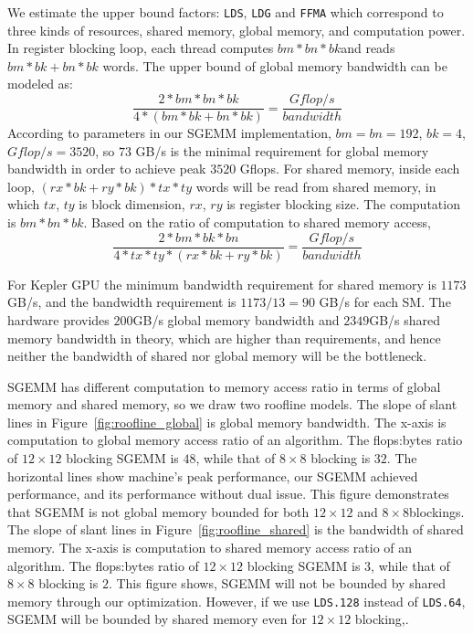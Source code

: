 We estimate the upper bound factors: {\tt LDS}, {\tt LDG} and {\tt FFMA} which correspond to three kinds of resources, 
shared
memory, global memory, and computation power. In register blocking loop, each thread computes $bm*bn*bk$and reads $bm*bk+bn*bk$ words. The upper bound of global memory bandwidth can be modeled as:
\begin{displaymath}
    \frac{2*bm*bn*bk}{4*(bm*bk + bn*bk)} = \frac{Gflop/s}{bandwidth}
\end{displaymath}
According to parameters in our SGEMM implementation, $bm=bn=192$, $bk=4$, $Gflop/s=3520$, so $73$ GB/s is the minimal
requirement for global memory bandwidth in order to achieve peak $3520$ Gflops.
For shared memory, inside each loop, $(rx*bk + ry * bk)*tx*ty$ words will be read from shared memory, in which $tx$,
$ty$ is block dimension, $rx$, $ry$ is register blocking size. The computation is $bm*bn*bk$. Based on the ratio of computation to shared memory access,
\begin{displaymath}
    \frac{2*bm*bk*bn}{4*tx*ty*(rx*bk + ry *bk)}  = \frac{Gflop/s}{bandwidth}
\end{displaymath}


For Kepler GPU the minimum bandwidth requirement for shared memory is $1173$GB/s, and the bandwidth requirement is
$1173/13=90$ GB/s for each SM. The hardware provides $200$GB/s global memory bandwidth and $2349$GB/s shared memory bandwidth in theory, which are higher than requirements, and hence neither the bandwidth of shared nor global memory will be the bottleneck.

SGEMM has different computation to memory access ratio in terms of global memory and shared memory, so we draw two roofline models. 
The slope of slant lines in Figure~\ref{fig:roofline_global} is global memory bandwidth. The x-axis is computation to global
memory access ratio of an algorithm. 
The flops:bytes ratio of $12\times12$ blocking SGEMM is $48$, while that of $8\times 8$ blocking is $32$. The horizontal lines show machine's peak performance, our SGEMM achieved performance, and its performance without dual issue.
This figure demonstrates that SGEMM is not global memory bounded for both $12\times12$ and $8\times 8$blockings.
The slope of slant lines in Figure~\ref{fig:roofline_shared} is the bandwidth of shared memory. The x-axis is computation to
shared memory access ratio of an algorithm. 
The flops:bytes ratio of $12\times12$ blocking SGEMM is $3$, while that of $8\times 8$ blocking is $2$.
This figure shows, SGEMM will not be bounded by shared memory through our optimization. 
However, if we use {\tt LDS.128} instead of
{\tt LDS.64}, SGEMM will be bounded by shared memory even for $12\times 12$ blocking,.



